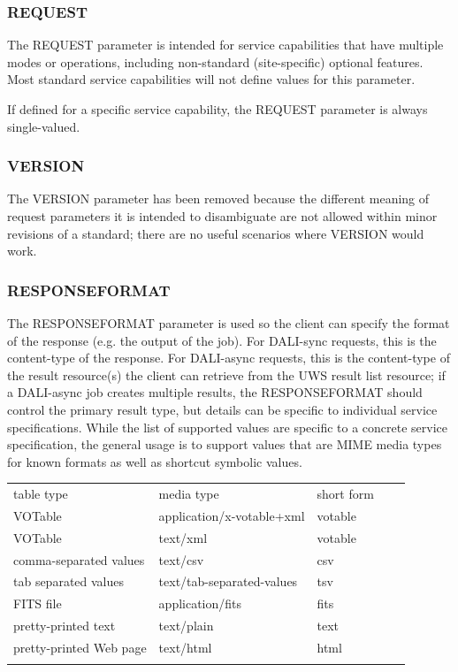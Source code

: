 \documentclass[11pt,letter]{ivoa}
\begin{document}
\subsubsection{REQUEST}
\label{sec:REQUEST}
The REQUEST parameter is intended for service capabilities that have 
multiple modes or operations, including non-standard (site-specific) optional 
features. Most standard service capabilities will not define values for this 
parameter.

If defined for a specific service capability, the REQUEST parameter is always 
single-valued.

\subsubsection{VERSION}
\label{sec:VERSION}
The VERSION parameter has been removed because the different 
meaning of request 
parameters it is intended to disambiguate are not allowed within minor
revisions of a standard; there are no useful scenarios where VERSION would work.

\subsubsection{RESPONSEFORMAT}
\label{sec:RESPONSEFORMAT}
The RESPONSEFORMAT parameter is used so the client can specify the format of the 
response (e.g. the output of the job). For DALI-sync requests, this is the 
content-type of the response. For DALI-async requests, this is the content-type 
of the result resource(s) the client can retrieve from the UWS result list 
resource; if a DALI-async job creates multiple results, the RESPONSEFORMAT 
should control the primary result type, but details can be specific to 
individual service specifications. While the list of supported values are 
specific to a concrete service specification, the general usage is to support 
values that are MIME media types \citep{std:MIME} for known 
formats as well as 
shortcut symbolic values. 

\begin{tabular}{l l l l l}
\sptablerule
table type & media type & short form \\
\sptablerule
VOTable & application/x-votable+xml & votable & \\
VOTable & text/xml & votable & \\
comma-separated values & text/csv & csv & \\
tab separated values & text/tab-separated-values & tsv & \\
FITS file & application/fits & fits & \\
pretty-printed text & text/plain & text & \\
pretty-printed Web page & text/html & html & \\
\sptablerule
\label{tab:mimetypes}
\end{tabular}
\end{document}

